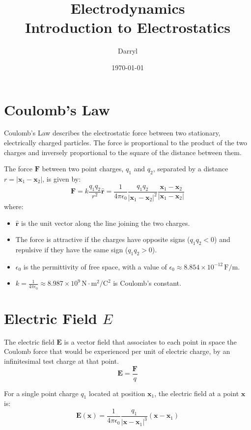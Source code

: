 \documentclass[12pt, a4paper]{article}
\title{\textbf{Electrodynamics\\Introduction to Electrostatics}}
\author{Darryl}
\date{\today}
\begin{document}
	
	\maketitle
	\tableofcontents
	\newpage
	
	\section{Coulomb's Law}
	
	Coulomb's Law describes the electrostatic force between two stationary, electrically charged particles. The force is proportional to the product of the two charges and inversely proportional to the square of the distance between them.
	
	The force $\bm{F}$ between two point charges, $q_1$ and $q_2$, separated by a distance $r = |\bm{x}_1 - \bm{x}_2|$, is given by:
	\begin{equation}
		\bm{F} = k \frac{q_1 q_2}{r^2} \hat{\bm{r}} = \frac{1}{4\pi\epsilon_0} \frac{q_1 q_2}{|\bm{x}_1 - \bm{x}_2|^2} \frac{\bm{x}_1 - \bm{x}_2}{|\bm{x}_1 - \bm{x}_2|}
	\end{equation}
	where:
	\begin{itemize}
		\item $\hat{\bm{r}}$ is the unit vector along the line joining the two charges.
		\item The force is attractive if the charges have opposite signs ($q_1 q_2 < 0$) and repulsive if they have the same sign ($q_1 q_2 > 0$).
		\item $\epsilon_0$ is the permittivity of free space, with a value of $\epsilon_0 \approx 8.854 \times 10^{-12} \, \text{F/m}$.
		\item $k = \frac{1}{4\pi\epsilon_0} \approx 8.987 \times 10^9 \, \text{N}\cdot\text{m}^2/\text{C}^2$ is Coulomb's constant.
	\end{itemize}
	
	\section{Electric Field $E$}
	
	The electric field $\bm{E}$ is a vector field that associates to each point in space the Coulomb force that would be experienced per unit of electric charge, by an infinitesimal test charge at that point.
	\begin{equation}
		\bm{E} = \frac{\bm{F}}{q}
	\end{equation}
    	
	For a single point charge $q_1$ located at position $\bm{x}_1$, the electric field at a point $\bm{x}$ is:
	\begin{equation}
		\bm{E}(\bm{x}) = \frac{1}{4\pi\epsilon_0} \frac{q_1}{|\bm{x} - \bm{x}_1|^3} (\bm{x} - \bm{x}_1)
	\end{equation}
        	
\end{document}
